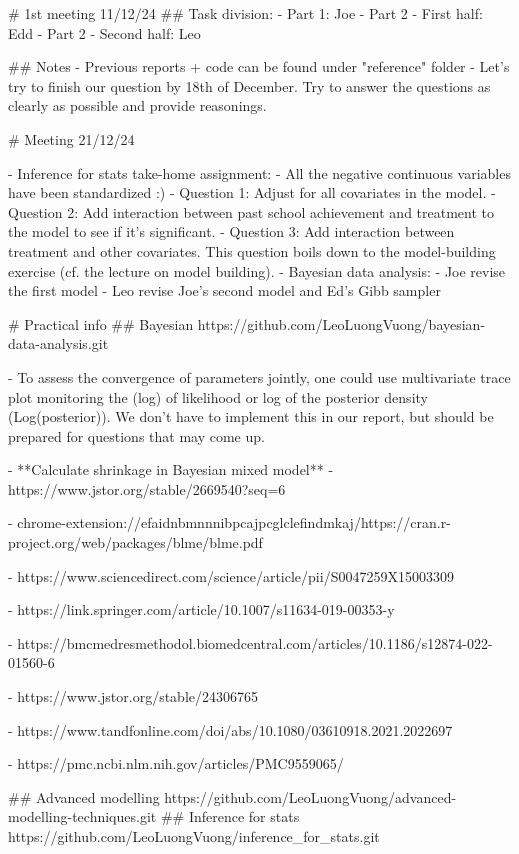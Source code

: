 \documentclass{article}
\begin{document}
\begin{markdown}
# 1st meeting 11/12/24
## Task division:
- Part 1: Joe
- Part 2 - First half: Edd
- Part 2 - Second half: Leo

## Notes
- Previous reports + code can be found under "reference" folder
- Let's try to finish our question by 18th of December. Try to answer the questions as clearly as possible and provide reasonings.

# Meeting 21/12/24

- Inference for stats take-home assignment:
  - All the negative continuous variables have been standardized :)
  - Question 1: Adjust for all covariates in the model.
  - Question 2: Add interaction between past school achievement and treatment to the model to see if it's significant.
  - Question 3: Add interaction between treatment and other covariates. This question boils down to the model-building exercise (cf. the lecture on model building).
- Bayesian data analysis:
  - Joe revise the first model 
  - Leo revise Joe's second model and Ed's Gibb sampler

# Practical info
## Bayesian
https://github.com/LeoLuongVuong/bayesian-data-analysis.git

- To assess the convergence of parameters jointly, one could use multivariate trace plot monitoring the (log) of likelihood or log of the posterior density (Log(posterior)). We don't have to implement this in our report, but should be prepared for questions that may come up. 

- **Calculate shrinkage in Bayesian mixed model**
    - https://www.jstor.org/stable/2669540?seq=6
    
    - chrome-extension://efaidnbmnnnibpcajpcglclefindmkaj/https://cran.r-project.org/web/packages/blme/blme.pdf
    
    - https://www.sciencedirect.com/science/article/pii/S0047259X15003309
    
    - https://link.springer.com/article/10.1007/s11634-019-00353-y
    
    - https://bmcmedresmethodol.biomedcentral.com/articles/10.1186/s12874-022-01560-6
    
    - https://www.jstor.org/stable/24306765
    
    - https://www.tandfonline.com/doi/abs/10.1080/03610918.2021.2022697
    
    - https://pmc.ncbi.nlm.nih.gov/articles/PMC9559065/


## Advanced modelling
https://github.com/LeoLuongVuong/advanced-modelling-techniques.git
## Inference for stats
https://github.com/LeoLuongVuong/inference_for_stats.git

\end{markdown}
\end{document}
